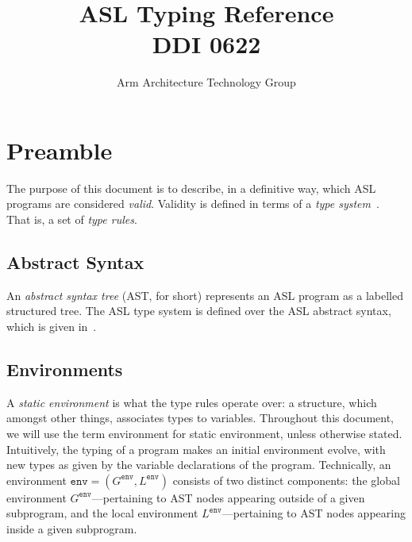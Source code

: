 \documentclass{book}
\author{Arm Architecture Technology Group}
\title{ASL Typing Reference \\ 
       DDI 0622}
\newcommand\tenv[0]{\texttt{env}}
\begin{document}
\maketitle

\tableofcontents{}





\chapter{Preamble}

The purpose of this document is to describe, in a definitive way, which ASL programs are considered \emph{valid}. Validity is defined in terms of a \emph{type system}~\cite{TypeSystemsLucaCardelli}. That is, a set of \emph{type rules}.

\section{Abstract Syntax}
An \emph{abstract syntax tree} (AST, for short) represents an ASL program as a labelled structured tree. 
%
The ASL type system is defined over the ASL abstract syntax, which is given in~\cite{ASLAbstractSyntaxReference}.

\section{Environments}

A \emph{static environment} is what the type rules operate over: a structure, which amongst
other things, associates types to variables. 
Throughout this document, we will use the term environment for static environment, unless otherwise stated. 
Intuitively, the typing of a
program makes an initial environment evolve, with new types as given by the
variable declarations of the program.
%
Technically, an environment $\tenv=(G^\tenv, L^\tenv)$ consists of two
distinct components: the global environment $G^\tenv$---pertaining to AST nodes
appearing outside of a given subprogram, and the local environment
$L^\tenv$---pertaining to AST nodes appearing inside a given subprogram.
\end{document}
